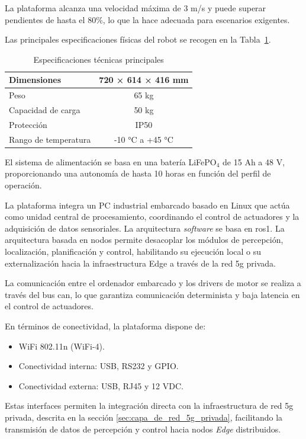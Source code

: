 La plataforma alcanza una velocidad máxima de 3 m/s y puede superar pendientes de hasta el 80\%, lo que la hace adecuada para escenarios exigentes.

Las principales especificaciones físicas del robot se recogen en la Tabla~\ref{tab:especificaciones_summit_xl}.

\begin{table}[H]
    \centering
    \begin{tabular}{|l|c|}
        \hline
        Dimensiones & 720 × 614 × 416 mm \\ \hline
        Peso & 65 kg \\ \hline
        Capacidad de carga & 50 kg \\ \hline
        Protección & IP50 \\ \hline
        Rango de temperatura & -10 °C a +45 °C \\ \hline
    \end{tabular}
    \caption{Especificaciones técnicas principales}
    \label{tab:especificaciones_summit_xl}
\end{table}

El sistema de alimentación se basa en una batería LiFePO$_4$ de 15 Ah a 48 V, proporcionando una autonomía de hasta 10 horas en función del perfil de operación.

La plataforma integra un PC industrial embarcado basado en Linux que actúa como unidad central de procesamiento, coordinando el control de actuadores y la adquisición de datos sensoriales. La arquitectura \textit{software} se basa en \gls{ros1}. La arquitectura basada en nodos permite desacoplar los módulos de percepción, localización, planificación y control, habilitando su ejecución local o su externalización hacia la infraestructura Edge a través de la red \gls{5g} privada.


La comunicación entre el ordenador embarcado y los drivers de motor se realiza a través del bus \gls{can}, lo que garantiza comunicación determinista y baja latencia en el control de actuadores.

En términos de conectividad, la plataforma dispone de:
\begin{itemize}
    \item WiFi 802.11n (WiFi-4).
    \item Conectividad interna: USB, RS232 y GPIO.
    \item Conectividad externa: USB, RJ45 y 12 VDC.
\end{itemize}

Estas interfaces permiten la integración directa con la infraestructura de red \gls{5g} privada, descrita en la sección \ref{sec:capa_de_red_5g_privada}, facilitando la transmisión de datos de percepción y control hacia nodos \textit{Edge} distribuidos.

